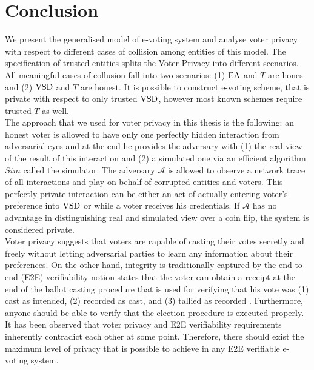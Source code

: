 \chapter{Conclusion}
We present the generalised model of e-voting system and analyse voter privacy with respect to different cases of collision among entities of this model. The specification of trusted entities splits the Voter Privacy into different scenarios. All meaningful cases of collusion fall into two scenarios: (1) $\operatorname{EA}$ and $T$ are hones and (2) $\operatorname{VSD}$ and $T$ are honest. It is possible to construct e-voting scheme, that is private with respect to only trusted $\operatorname{VSD}$, however most known schemes require trusted $T$ as well.  \\
 
The approach that we used for voter privacy in this thesis is the following: an honest voter is allowed to have only one perfectly hidden interaction from adversarial eyes and at the end he provides the adversary with (1) the real view of the result of this interaction and (2) a simulated one via an efficient algorithm $Sim$ called the simulator. The adversary $\mathcal{A}$ is allowed to observe a network trace of all interactions and play on behalf of corrupted entities and voters. This perfectly private interaction can be either an act of actually entering voter's preference into $\operatorname{VSD}$ or while a voter receives his credentials. If $\mathcal{A}$ has no advantage in distinguishing real and simulated view over a coin flip, the system is considered private.\\

Voter privacy suggests that voters are capable of casting their votes secretly and freely without letting adversarial parties to learn any information about their preferences. On the other hand, integrity is traditionally captured by the end-to-end (E2E) verifiability \cite{Benaloh2011} notion states that the voter can obtain a receipt at the end of the ballot casting procedure that is used for verifying that his vote was (1) cast as intended, (2) recorded as cast, and (3) tallied as recorded \cite{Kiayias2015a}. Furthermore, anyone should be able to verify that the election procedure is executed properly. It has been observed that voter privacy and E2E verifiability requirements inherently contradict each other at some point.  Therefore, there should exist the maximum level of privacy that is possible to achieve in any E2E verifiable e-voting system.\\

